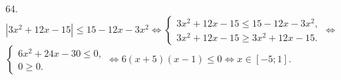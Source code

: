 64. $|3x^2+12x-15|\leqslant15-12x-3x^2\Leftrightarrow\begin{cases}3x^2+12x-15\leqslant15-12x-3x^2,\\3x^2+12x-15\geqslant3x^2+12x-15.\end{cases}
\Leftrightarrow$\\$\begin{cases}6x^2+24x-30\leqslant0,\\0\geqslant0.\end{cases}\Leftrightarrow 6(x+5)(x-1)\leqslant0\Leftrightarrow x\in[-5;1].$\\
